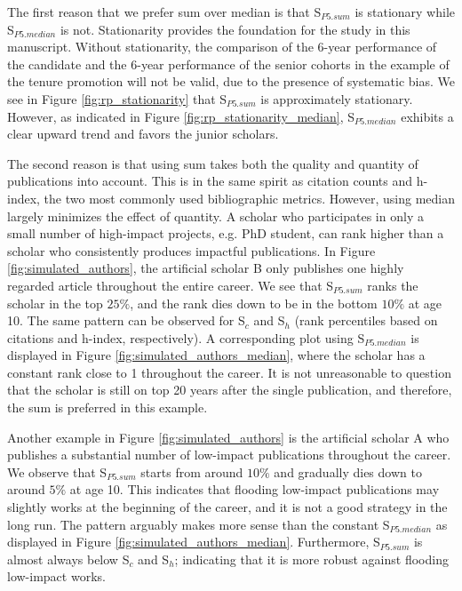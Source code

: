 \begin{refsection}
The first reason that we prefer sum over median is that S$_{P5.sum}$ is stationary while S$_{P5.median}$ is not. Stationarity provides the foundation for the study in this manuscript. Without stationarity, the comparison of the 6-year performance of the candidate and the 6-year performance of the senior cohorts in the example of the tenure promotion will not be valid, due to the presence of systematic bias. We see in Figure \ref{fig:rp_stationarity} that S$_{P5.sum}$ is approximately stationary. However, as indicated in Figure \ref{fig:rp_stationarity_median}, S$_{P5.median}$ exhibits a clear upward trend and favors the junior scholars. 

The second reason is that using sum takes both the quality and quantity of publications into account. This is in the same spirit as citation counts and h-index, the two most commonly used bibliographic metrics. However, using median largely minimizes the effect of quantity. A scholar who participates in only a small number of high-impact projects, e.g. PhD student, can rank higher than a scholar who consistently produces impactful publications. In Figure \ref{fig:simulated_authors}, the artificial scholar B only publishes one highly regarded article throughout the entire career. We see that S$_{P5.sum}$ ranks the scholar in the top $25\%$, and the rank dies down to be in the bottom $10\%$ at age 10. The same pattern can be observed for S$_{c}$ and S$_{h}$ (rank percentiles based on citations and h-index, respectively). A corresponding plot using S$_{P5.median}$ is displayed in Figure \ref{fig:simulated_authors_median}, where the scholar has a constant rank close to 1 throughout the career. It is not unreasonable to question that the scholar is still on top 20 years after the single publication, and therefore, the sum is preferred in this example.

Another example in Figure \ref{fig:simulated_authors} is the artificial scholar A who publishes a substantial number of low-impact publications throughout the career. We observe that S$_{P5.sum}$ starts from around $10\%$ and gradually dies down to around $5\%$ at age 10. This indicates that flooding low-impact publications may slightly works at the beginning of the career, and it is not a good strategy in the long run. The pattern arguably makes more sense than the constant S$_{P5.median}$ as displayed in Figure \ref{fig:simulated_authors_median}. Furthermore, S$_{P5.sum}$ is almost always below S$_{c}$ and S$_{h}$; indicating that it is more robust against flooding low-impact works. 


\end{refsection}
